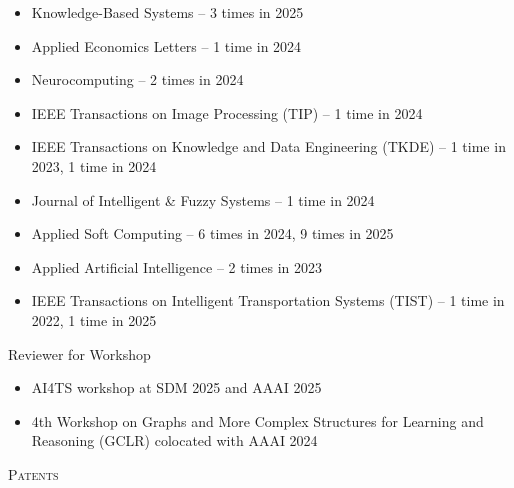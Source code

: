 \documentclass[10pt]{article}
\newenvironment{changemargin}[2]{
  \begin{list}{}{
    \setlength{\topsep}{0pt}
    \setlength{\leftmargin}{#1}
    \setlength{\rightmargin}{#2}
    \setlength{\listparindent}{\parindent}
    \setlength{\itemindent}{\parindent}
    \setlength{\parsep}{\parskip}
  }
  \item[]}{\end{list}
}
\newcommand{\lineover}{
	\begin{changemargin}{-0.05in}{-0.05in}
		\vspace*{-8pt}
		\hrulefill \\
		\vspace*{-2pt}
	\end{changemargin}
}
\newcommand{\header}[1]{
	\begin{changemargin}{-0.5in}{-0.5in}
		\scshape{#1}\\
  	\lineover
	\end{changemargin}
}
\newenvironment{body} {
	\vspace*{-16pt}
	\begin{changemargin}{-0.25in}{-0.5in}
  }
	{\end{changemargin}
}
\begin{document}
\begin{body}
\begin{itemize}
        \item Knowledge-Based Systems – 3 times in 2025
        \item Applied Economics Letters – 1 time in 2024
        \item Neurocomputing – 2 times in 2024
        \item IEEE Transactions on Image Processing (TIP) – 1 time in 2024
        \item IEEE Transactions on Knowledge and Data Engineering (TKDE) – 1 time in 2023, 1 time in 2024
        \item Journal of Intelligent \& Fuzzy Systems – 1 time in 2024
        \item Applied Soft Computing – 6 times in 2024, 9 times in 2025
        \item Applied Artificial Intelligence – 2 times in 2023
        \item IEEE Transactions on Intelligent Transportation Systems (TIST) – 1 time in 2022, 1 time in  2025
    \end{itemize}
   Reviewer for Workshop
    \begin{itemize}
        \item AI4TS workshop at SDM 2025 and AAAI 2025
        \item 4th Workshop on Graphs and More Complex Structures for Learning and Reasoning (GCLR) colocated with AAAI 2024
    \end{itemize}
\end{body}

\medskip

\header{Patents}
\end{document}
